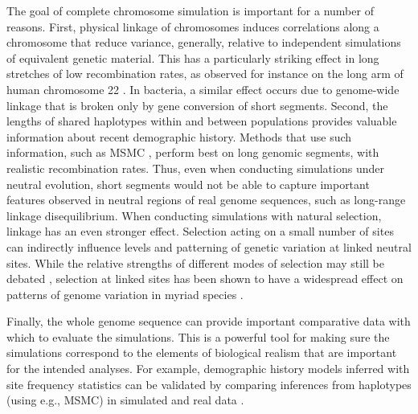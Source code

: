 \documentclass[hidelinks]{article}
\begin{document}
The goal of complete chromosome simulation is important for a number of reasons.
First, physical linkage of chromosomes induces correlations along a chromosome that
reduce variance, generally, relative to independent simulations of equivalent genetic material.
This has a particularly striking effect in long stretches of low recombination rates,
as observed for instance on the long arm of human chromosome 22 \citep{Dawson2002}.
In bacteria, a similar effect occurs due to genome-wide linkage that is broken only
by gene conversion of short segments.
Second, the lengths of shared haplotypes within and
between populations provides valuable information about recent demographic history.
Methods that use such information, such as MSMC \citep{Schiffels2020}, perform best
on long genomic segments, with realistic recombination rates.
Thus, even when conducting simulations under neutral evolution, short segments
would not be able to capture important features observed in neutral regions of
real genome sequences, such as long-range linkage disequilibrium.
%
When conducting simulations with natural selection, linkage has
an even stronger effect. Selection acting on a small number of sites can
indirectly influence levels and patterning of genetic variation at linked
neutral sites. While the relative strengths of different modes of selection
may still be debated \citep{kern2018neutral,jensen2019importance},
selection at linked sites has been shown to have a widespread
effect on patterns of genome variation in myriad species
\citep[e.g.,][]{McVicker2009,Charlesworth2012}.

Finally, the whole genome sequence can provide important comparative
data with which to evaluate the simulations. This is a powerful tool for
making sure the simulations correspond to the elements of biological
realism that are important for the intended analyses.
For example, demographic history models inferred with site frequency statistics \citep{Gutenkunst2009}
can be validated by comparing inferences from haplotypes (using e.g., MSMC) in simulated and real data \citep[e.g.,][]{Hsieh2016a}.
\end{document}
